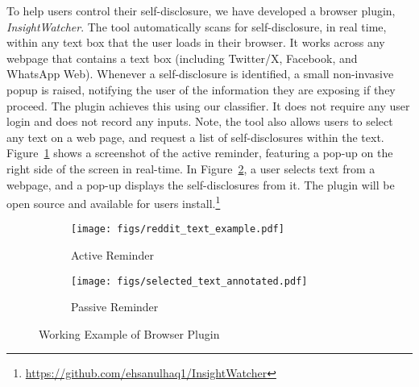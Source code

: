 To help users control their self-disclosure, we have developed a browser plugin, \textit{InsightWatcher}. The tool automatically scans for self-disclosure, in real time, within any text box that the user loads in their browser. It works across any webpage that contains a text box (including Twitter/X, Facebook, and WhatsApp Web). Whenever a self-disclosure is identified, a small non-invasive popup is raised, notifying the user of the information they are exposing if they proceed.
The plugin achieves this using our classifier. %
It does not require any user login and does not record any inputs. 
Note, the tool also allows users to select any text on a web page, and request a list of self-disclosures within the text.
Figure~\ref{fig:sd_active_reminder} shows a screenshot of the active reminder, featuring a pop-up on the right side of the screen in real-time. In Figure~\ref{fig:sd_passive_reminder}, a user selects text from a webpage, and a pop-up displays the self-disclosures from it. The plugin will be open source and available for users install.\footnote{\url{https://github.com/ehsanulhaq1/InsightWatcher}}




\begin{figure}[t]
    \centering
    \begin{subfigure}{.48\textwidth}
        \centering
        \texttt{[image: figs/reddit\_text\_example.pdf]}
        \caption{Active Reminder}%
        \label{fig:sd_active_reminder}
    \quad
    \end{subfigure}
    \begin{subfigure}{.48\textwidth}
        \centering
        \texttt{[image: figs/selected\_text\_annotated.pdf]}
        \caption{Passive Reminder}%
        \label{fig:sd_passive_reminder}
    \end{subfigure}
    \caption{Working Example of Browser Plugin}
    \label{fig:browser_plugin}
\end{figure}
